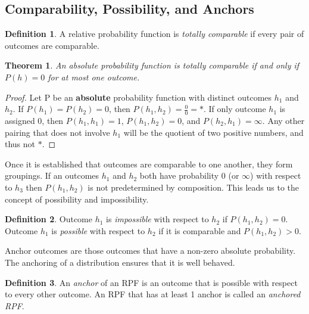 \documentclass[twoside]{article}
\theoremstyle{plain}%
\newtheorem{theorem}{Theorem}[section]
\theoremstyle{definition}
\newtheorem{definition}{Definition}[section]
\theoremstyle{remark}
\begin{document}
\subsection{Comparability, Possibility, and Anchors}

\begin{definition}
\label{def:totally_comparable}
A relative probability function is \textit{totally comparable} if every pair of outcomes are comparable.
\end{definition}

\begin{theorem}
\label{thm:abs_totally_comparable}
An absolute probability function is totally comparable if and only if \(P(h) = 0\) for at most one outcome.
\end{theorem}

\begin{proof}
Let P be an \textbf{absolute} probability function with distinct outcomes \(h_1\) and \(h_2\). If \(P(h_1) = P(h_2) = 0\), then \(P(h_1, h_2) = \frac{0}{0} = \ast\). If only outcome \(h_1\) is assigned 0, then \(P(h_1, h_1) = 1\), \(P(h_1, h_2) = 0\), and \(P(h_2, h_1) = \infty\). Any other pairing that does not involve \(h_1\) will be the quotient of two positive numbers, and thus not \(\ast\).
\end{proof}

Once it is established that outcomes are comparable to one another, they form groupings. If an outcomes \(h_1\) and \(h_2\) both have probability 0 (or \(\infty\)) with respect to \(h_3\) then \(P(h_1, h_2)\) is not predetermined by composition. This leads us to the concept of possibility and impossibility.

\begin{definition}
Outcome \(h_1\) is \textit{impossible} with respect to \(h_2\) if \(P(h_1, h_2) = 0\). Outcome \(h_1\) is \textit{possible} with respect to \(h_2\) if it is comparable and \(P(h_1, h_2) > 0\).
\end{definition}

Anchor outcomes are those outcomes that have a non-zero absolute probability. The anchoring of a distribution ensures that it is well behaved.

\begin{definition}
\label{def:anchored_rpf}
An \textit{anchor} of an RPF is an outcome that is possible with respect to every other outcome. An RPF that has at least 1 anchor is called an \textit{anchored RPF}.
\end{definition}
\end{document}
